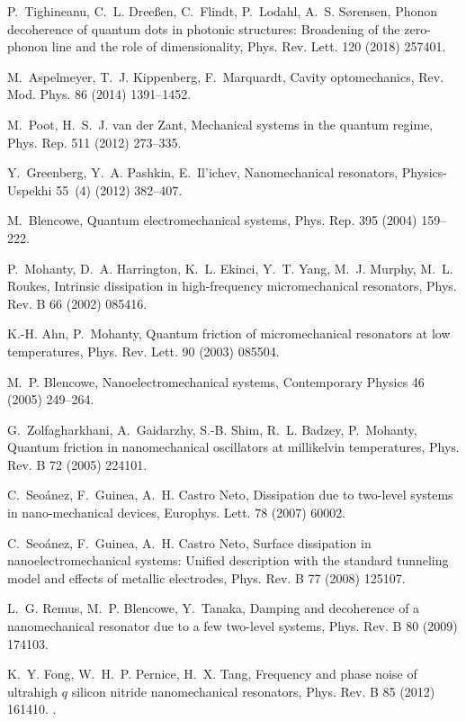 \documentclass[3p,sort&compress]{elsarticle}
\begin{document}
\begin{thebibliography}{100}
P.~Tighineanu, C.~L. Dree\ss{}en, C.~Flindt, P.~Lodahl, A.~S. S\o{}rensen,
  Phonon decoherence of quantum dots in photonic structures: Broadening of the
  zero-phonon line and the role of dimensionality, Phys. Rev. Lett. 120 (2018)
  257401.

M.~Aspelmeyer, T.~J. Kippenberg, F.~Marquardt, Cavity optomechanics, Rev. Mod.
  Phys. 86 (2014) 1391--1452.

M.~Poot, H.~S.~J. {van der Zant}, Mechanical systems in the quantum regime,
  Phys. Rep. 511 (2012) 273--335.

Y.~Greenberg, Y.~A. Pashkin, E.~Il{'}ichev, Nanomechanical resonators,
  Physics-Uspekhi 55~(4) (2012) 382--407.

M.~Blencowe, Quantum electromechanical systems, Phys. Rep. 395 (2004) 159--222.

P.~Mohanty, D.~A. Harrington, K.~L. Ekinci, Y.~T. Yang, M.~J. Murphy, M.~L.
  Roukes, Intrinsic dissipation in high-frequency micromechanical resonators,
  Phys. Rev. B 66 (2002) 085416.

K.-H. Ahn, P.~Mohanty, Quantum friction of micromechanical resonators at low
  temperatures, Phys. Rev. Lett. 90 (2003) 085504.

M.~P. Blencowe, Nanoelectromechanical systems, Contemporary Physics 46 (2005)
  249--264.

G.~Zolfagharkhani, A.~Gaidarzhy, S.-B. Shim, R.~L. Badzey, P.~Mohanty, Quantum
  friction in nanomechanical oscillators at millikelvin temperatures, Phys.
  Rev. B 72 (2005) 224101.

C.~Seo{\'a}nez, F.~Guinea, A.~H. {Castro Neto}, Dissipation due to two-level
  systems in nano-mechanical devices, Europhys. Lett. 78 (2007) 60002.

C.~Seo{\'a}nez, F.~Guinea, A.~H. {Castro Neto}, Surface dissipation in
  nanoelectromechanical systems: {U}nified description with the standard
  tunneling model and effects of metallic electrodes, Phys. Rev. B 77 (2008)
  125107.

L.~G. Remus, M.~P. Blencowe, Y.~Tanaka, Damping and decoherence of a
  nanomechanical resonator due to a few two-level systems, Phys. Rev. B 80
  (2009) 174103.

K.~Y. Fong, W.~H.~P. Pernice, H.~X. Tang, Frequency and phase noise of
  ultrahigh $q$ silicon nitride nanomechanical resonators, Phys. Rev. B 85
  (2012) 161410.
\newblock \href {http://dx.doi.org/10.1103/PhysRevB.85.161410}
  {}.


\end{thebibliography}
\end{document}
